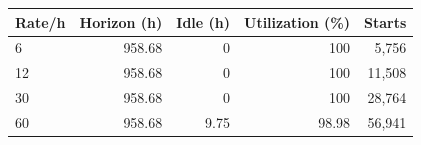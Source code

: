 \begin{tabular}{lrrrr}
\toprule
Rate/h & Horizon (h) & Idle (h) & Utilization (\%) & Starts \\
\midrule
6 & 958.68 & 0 & 100 & 5,756 \\
12 & 958.68 & 0 & 100 & 11,508 \\
30 & 958.68 & 0 & 100 & 28,764 \\
60 & 958.68 & 9.75 & 98.98 & 56,941 \\
\bottomrule
\end{tabular}
